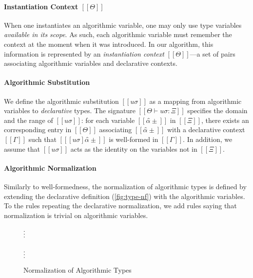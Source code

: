 \paragraph*{Instantiation Context $[[Θ]]$}
When one instantiates an algorithmic variable, one may only use type variables
\emph{available in its scope}. As such, each algorithmic variable must remember
the context at the moment when it was introduced. In our algorithm, this
information is represented by an \emph{instantiation context} $[[Θ]]$---a set of
pairs associating algorithmic variables and declarative contexts.

\paragraph*{Algorithmic Substitution}
We define the algorithmic substitution $[[uσ]]$ as a mapping from algorithmic
variables to \emph{declarative} types. The signature $[[Θ ⊢ uσ : Ξ]]$
specifies the domain and the range of $[[uσ]]$: for each variable $[[α̂±]]$
in $[[Ξ]]$, there exists an corresponding entry in $[[Θ]]$ associating 
$[[α̂±]]$ with a declarative context $[[Γ]]$ such that $[[ [uσ]α̂± ]]$
is well-formed in $[[Γ]]$. In addition, we assume that $[[uσ]]$
acts as the identity on the variables not in $[[Ξ]]$.


\paragraph*{Algorithmic Normalization}
Similarly to well-formedness, the normalization of algorithmic types is defined
by extending the declarative definition (\cref{fig:type-nf}) with the
algorithmic variables. To the rules repeating the declarative normalization, we
add rules saying that normalization is trivial on algorithmic variables.

\begin{figure}
\begin{multicols}{2}
  $\vcenter{\hbox{\vdots}}$\\
  \ottusedrule{\ottdruleNrmPUVar{}}
  \columnbreak\\
  $\vcenter{\hbox{\vdots}}$\\
  \ottusedrule{\ottdruleNrmNUVar{}}
\end{multicols}
\caption{Normalization of Algorithmic Types}
\label{fig:algo-nf}
\end{figure}

